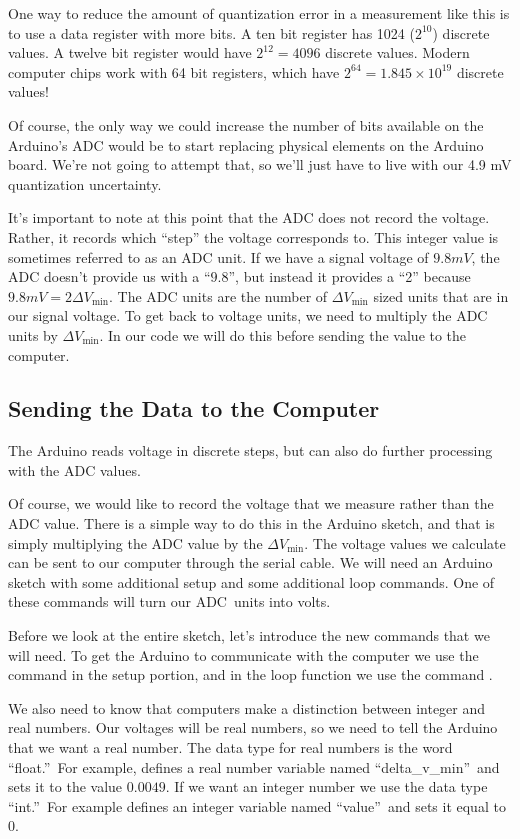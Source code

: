 One way to reduce the amount of quantization error in a measurement like this
is to use a data register with more bits. A ten bit register has 1024 
($2^{10}$) discrete
values. A twelve bit register would have $2^{12}=4096$
discrete values. Modern computer chips work with 64 bit registers, which have
$2^{64}=1.845\times10^{19}$ discrete values!

Of course, the only way we could increase the number of bits available on the
Arduino's ADC would be to start replacing physical elements on the Arduino
board. We're not going to attempt that, so we'll just have to live with our
4.9 mV quantization uncertainty.

It's important to note at this point that the ADC does not record the voltage.
Rather, it records which ``step'' the voltage corresponds to. This integer value
is sometimes referred to as an ADC unit.
If we have a signal voltage of $9.8\unit{mV}$, the ADC doesn't provide
us with a ``$9.8$'', but instead it provides a ``2''
because $9.8\unit{mV}=2\Delta V_{\min }.$ The ADC units are the
number of $\Delta V_{\min }$ sized units that are in our signal voltage. To
get back to voltage units, we need to multiply the ADC units 
by $\Delta V_{\min }.$ In our
code we will do this before sending the value to the computer.

\subsection{Sending the Data to the Computer}

The Arduino reads voltage in discrete steps, but can also do further processing
with the ADC values.

Of course, we would like to record the voltage that we measure rather than
the ADC value. There is a
simple way to do this in the Arduino sketch, and that is simply multiplying 
the ADC value by the $\Delta V_{\min}$. 
The voltage values we calculate can be sent to our
computer through the serial cable. We will need an Arduino sketch with some
additional setup and some additional loop commands. One of these commands
will turn our ADC\ units into volts.

Before we look at the entire sketch, let's introduce the new commands that
we will need. To get the Arduino to communicate with the computer we use the
command  in the setup portion, and 
in the loop function we use the command .

We also need to know that computers make a distinction between integer and
real numbers. Our voltages will be real numbers, so we need to tell the
Arduino that we want a real number. The data type for real numbers is the word
\textquotedblleft float.\textquotedblright\ For example,
defines a real number 
variable named \textquotedblleft delta\_v\_min\textquotedblright\
and sets it to the value $0.0049.$ If we want an integer number we use the
data type \textquotedblleft int.\textquotedblright\ For example
defines an integer 
variable named \textquotedblleft value\textquotedblright\ and sets
it equal to 0. 

